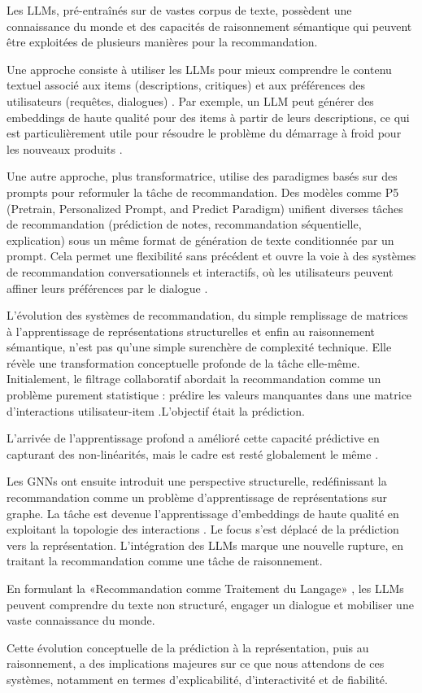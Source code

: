 Les LLMs, pré-entraînés sur de vastes corpus de texte, possèdent une connaissance du monde et des capacités de raisonnement sémantique qui peuvent être exploitées de plusieurs manières pour la recommandation. 

Une approche consiste à utiliser les LLMs pour mieux comprendre le contenu textuel associé aux items (descriptions, critiques) et aux préférences des utilisateurs (requêtes, dialogues) \citep{Zhang2023, Wang2024}. Par exemple, un LLM peut générer des embeddings de haute qualité pour des items à partir de leurs descriptions, ce qui est particulièrement utile pour résoudre le problème du démarrage à froid pour les nouveaux produits \citep{Sanner2023}.

Une autre approche, plus transformatrice, utilise des paradigmes basés sur des prompts pour reformuler la tâche de recommandation. Des modèles comme P5 (Pretrain, Personalized Prompt, and Predict Paradigm) \citet{Geng2022} unifient diverses tâches de recommandation (prédiction de notes, recommandation séquentielle, explication) sous un même format de génération de texte conditionnée par un prompt. Cela permet une flexibilité sans précédent et ouvre la voie à des systèmes de recommandation conversationnels et interactifs, où les utilisateurs peuvent affiner leurs préférences par le dialogue \citep{Wang2024}.

L'évolution des systèmes de recommandation, du simple remplissage de matrices à l'apprentissage de représentations structurelles et enfin au raisonnement sémantique, n'est pas qu'une simple surenchère de complexité technique. Elle révèle une transformation conceptuelle profonde de la tâche elle-même. Initialement, le filtrage collaboratif abordait la recommandation comme un problème purement statistique : prédire les valeurs manquantes dans une matrice d'interactions utilisateur-item \citep{Sarwar2001, Su2009}.L'objectif était la prédiction.

L'arrivée de l'apprentissage profond a amélioré cette capacité prédictive en capturant des non-linéarités, mais le cadre est resté globalement le même \citet{He2017}.

Les GNNs ont ensuite introduit une perspective structurelle, redéfinissant la recommandation comme un problème d'apprentissage de représentations sur graphe. La tâche est devenue l'apprentissage d'embeddings de haute qualité en exploitant la topologie des interactions \citep{Wang2019, Wu2022}. Le focus s'est déplacé de la prédiction vers la représentation. L'intégration des LLMs marque une nouvelle rupture, en traitant la recommandation comme une tâche de raisonnement. 

En formulant la «Recommandation comme Traitement du Langage» \citet{Geng2022}, les LLMs peuvent comprendre du texte non structuré, engager un dialogue et mobiliser une vaste connaissance du monde. 

Cette évolution conceptuelle de la prédiction à la représentation, puis au raisonnement, a des implications majeures sur ce que nous attendons de ces systèmes, notamment en termes d'explicabilité, d'interactivité et de fiabilité.
